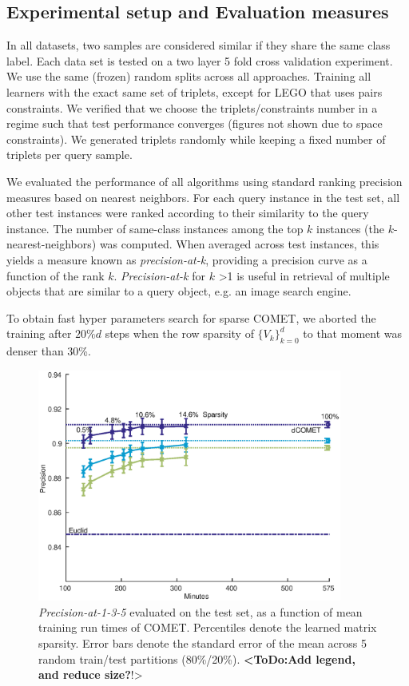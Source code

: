 \documentclass[twoside,11pt]{article}
\newcommand\todo[1]{\textbf{<ToDo:#1}!>}
\newcommand\mat[1]{{#1}}
\newcommand{\Vk}{\mat{V_k}}
\newcommand{\Vg}{\{\Vk\}_{k=0}^{d}} %
\begin{document}
\subsection{Experimental setup and Evaluation measures}
In all datasets, two samples are considered similar if they share the same class label. Each data set is tested on a two layer 5 fold cross validation experiment. We use the same (frozen) random splits across all approaches. Training all learners with the exact same set of triplets, except for LEGO that uses pairs constraints. We verified that we choose the triplets/constraints number in a regime such that test performance converges (figures not shown due to space constraints). We generated triplets randomly while keeping a fixed number of triplets per query sample.

We evaluated the performance of all algorithms using standard ranking precision measures based on nearest neighbors. For each query instance in the test set, all other test instances were ranked according to their similarity to the query instance. The number of same-class instances
among the top $k$ instances (the $k$-nearest-neighbors) was computed. When averaged across test
instances, this yields a measure known as \textit{precision-at-k},
providing a precision curve as a function of the rank $k$. \textit{Precision-at-k} for $k$ >1 is useful in retrieval of multiple objects that are similar to a query object, e.g. an image search engine.

To obtain fast hyper parameters search for sparse COMET, we aborted the training after $20\% d$ steps when the row sparsity of $\Vg$ to that moment was denser than 30\%. 

\begin{figure}[ht]
\centering
\includegraphics[width=10cm]{sCOMET_precision_vs_runtime}
\captionsetup{font=small}
\caption{\textit{Precision-at-1-3-5} evaluated on the test set, as a function of mean training run times of COMET. Percentiles denote the learned matrix sparsity. Error bars denote the standard error of the mean across 5 random train/test partitions (80\%/20\%). \todo{Add legend, and reduce size?}}\label{spCometPrecTime}
\end{figure}
\end{document}
